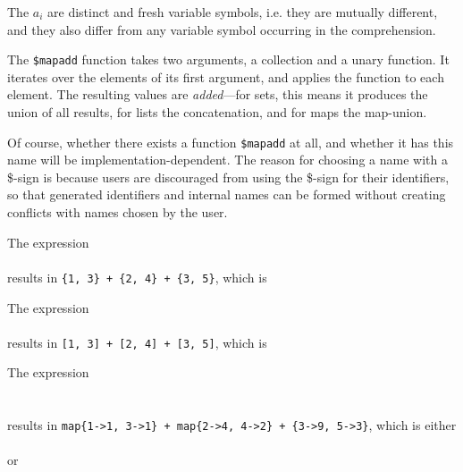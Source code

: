 The $a_i$ are distinct and fresh variable symbols, i.e. they are
mutually different, and they also differ from any variable symbol
occurring in the comprehension.


The {\tt \$mapadd} function takes two arguments, a
collection and a unary function. It iterates over the elements of its
first argument, and applies the function to each element. The
resulting values are {\em added}---for sets, this means it produces
the union of all results, for lists the concatenation, and for maps
the map-union.

\begin{rationale}\label{lbl:RationaleIteratorName}
  Of course, whether there exists a function {\tt \$mapadd} at all,
  and whether it has this name will be implementation-dependent. The
  reason for choosing a name with a \$-sign is because users are
  discouraged from using the \$-sign for their identifiers, so that
  generated identifiers and internal names can be formed without
  creating conflicts with names chosen by the user.
\end{rationale}

\begin{example}
  The expression\\
\\
results in {\tt \{1, 3\} + \{2, 4\} + \{3, 5\}}, which is\\

  The expression\\
\\
results in {\tt [1, 3] + [2, 4] + [3, 5]}, which is\\
\exindent{\tt [1, 3, 2, 4, 3, 5]}

  The expression\\
\\
\exindent{}\\
results in {\tt map\{1->1, 3->1\} + map\{2->4, 4->2\} + \{3->9,
  5->3\}}, which is either\\
\\
or\\
\end{example}

